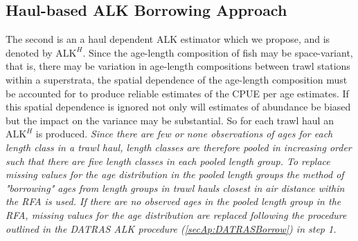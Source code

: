 \documentclass[a4paper 12pt]{article}
\numberwithin{equation}{section}
\begin{document}
\subsection{\normalsize Haul-based ALK Borrowing Approach}
\label{secAp:oursBorrow}
\indent  The second is an a haul dependent ALK estimator which we propose, and is denoted by $\mathrm{ALK}^{H}$. Since the age-length composition of fish may be space-variant, that is, there may be variation in age-length compositions between trawl stations within a superstrata, the spatial dependence of the age-length composition must be accounted for to produce reliable estimates of the CPUE per age estimates. If this spatial dependence is ignored not only will estimates of abundance be biased but the impact on the variance may be substantial. So for each trawl haul an $\mathrm{ALK}^{H}$ is produced. \emph{Since there are few or none observations of ages for each length class in a trawl haul, length classes are therefore pooled in increasing order such that there are five length classes in each pooled length group. To replace missing values for the age distribution in the pooled length groups the method of "borrowing" ages from length groups in trawl hauls closest in air distance within the RFA is used. If there are no observed ages in the pooled length group in the RFA, missing values for the age distribution are replaced following the procedure outlined in the DATRAS ALK procedure (\ref{secAp:DATRASBorrow}) in step 1.  }
\end{document}
